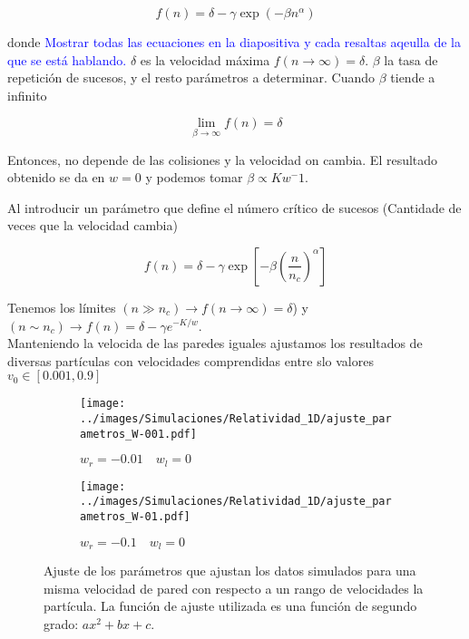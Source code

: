 \documentclass[11pt, spanish]{article}
\begin{document}
\begin{equation}\label{eq:acumulativa_general}
    f(n) = \delta - \gamma\exp(-\beta n^\alpha)
\end{equation}

donde \textcolor{blue}{Mostrar todas las ecuaciones en la diapositiva y cada resaltas aqeulla de la que se está hablando.} \( \delta \) es la velocidad máxima \( f(n \rightarrow \infty) = \delta \). \( \beta \) la tasa de repetición de sucesos, y el resto parámetros a determinar. Cuando \( \beta \) tiende a infinito 

\begin{equation}
    \lim_{\beta \rightarrow \infty} f(n) = \delta
\end{equation}

Entonces, no depende de las colisiones y la velocidad on cambia. El resultado obtenido se da en \( w = 0 \) y podemos tomar \( \beta \propto Kw^-1 \). 

Al introducir un parámetro que define el número crítico de sucesos (Cantidade de veces que la velocidad cambia) 

\begin{equation}
    f(n) = \delta - \gamma \exp\left[ -\beta \left( \dfrac{n}{n_c} \right)^\alpha \right]
\end{equation}

Tenemos los límites \((n\gg n_c)  \rightarrow f(n \rightarrow \infty) = \delta\)) y \( (n \sim n_c) \rightarrow f(n) = \delta - \gamma e^{-K/w} \). \\

Manteniendo la velocida de las paredes iguales ajustamos los resultados de diversas partículas con velocidades comprendidas entre slo valores  \( v_0 \in [0.001, 0.9] \)

\begin{figure}[H]
    \begin{subfigure}[b]{0.5\textwidth}
        \centering
        \texttt{[image: ../images/Simulaciones/Relatividad\_1D/ajuste\_parametros\_W-001.pdf]}
        \caption{$w_r = -0.01 \quad w_l = 0$}
    \end{subfigure}
    \hfill
    \begin{subfigure}[b]{0.5\textwidth}
        \centering
        \texttt{[image: ../images/Simulaciones/Relatividad\_1D/ajuste\_parametros\_W-01.pdf]}
        \caption{$w_r = -0.1 \quad w_l = 0$}
    \end{subfigure}
    \caption{Ajuste de los parámetros que ajustan los datos simulados para una misma velocidad de pared con respecto a un rango de velocidades la partícula. La función de ajuste utilizada es una función de segundo grado: \( ax^2 + bx + c \).}
    \label{fig:ajuste_parametros_1D_relativity}
\end{figure}
\end{document}
